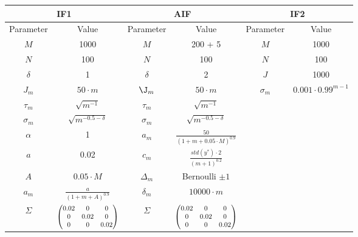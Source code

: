 \documentclass[twoside,openright]{report}
\newcommand\scalemath[2]{\scalebox{#1}{\mbox{\ensuremath{\displaystyle #2}}}}
\begin{document}
\begin{table}[h]
{    \begin{tabular}{ c  c | c  c | c  c }
    \toprule
        \multicolumn{2}{c}{IF1} & \multicolumn{2}{c}{AIF} & \multicolumn{2}{c}{IF2} \\ 
    \midrule
        Parameter   &   Value              & Parameter     & Value                    & Parameter & Value \\
        $M$         &   1000               &     $M$       & 200  + 5                   & $M$       &   1000    \\   
        $N$         &   100                &     $N$       &  100                     & $N$       & 100 \\
        $\delta$       &   1       &      $\delta$    &  2            & $J$       & 1000   \\
        $J_m$    &   $50 \cdot m$     &   $\J_m$    &  $50 \cdot m$         & $\sigma_m$  &  $0.001 \cdot 0.99^{m-1}$   \\
        $\tau_m$    &   $\sqrt{m^{-1}}$                   & $\tau_m$       & $\sqrt{m^{-1}}$                        &             &   \\    
        $\sigma_m$    &   $\sqrt{m^{-0.5-\delta}}$                  & $\sigma_m$    & $\sqrt{m^{-0.5-\delta}}$ &             &       \\
        $\alpha$         &   1                &$a_m$       &    $\frac{50}{(1+m+0.05 \cdot M)^{0.9}}$                    &             &    \\
        $a$         &   0.02     &  $c_m$       & $\frac{std(y^{*}) \cdot 2}{(m+1)^{0.2}}$  &           &       \\
        $A$       &   $0.05 \cdot M$  &  $\Delta_m$  & Bernoulli $\pm 1$   &           &                 \\ 
        $a_m$  &   $\frac{a}{(1+m+A)^{0.9}} $    &  $\delta_m$    &    $10000 \cdot m$                        &           &       \\
        $\Sigma$    &   $\scalemath{0.8}{\begin{pmatrix} 
       0.02 & 0 & 0 \\
       0 & 0.02 & 0 \\
       0 & 0 & 0.02
     \end{pmatrix}}$               &       $\Sigma$          &          $\scalemath{0.8}{\begin{pmatrix} 
       0.02 & 0 & 0 \\
       0 & 0.02 & 0 \\
       0 & 0 & 0.02
     \end{pmatrix}}$                  &           &       \\ 
        \bottomrule
    \end{tabular}
    }
    \label{tab:par_settings_Gompertz}
\end{table}
\end{document}
